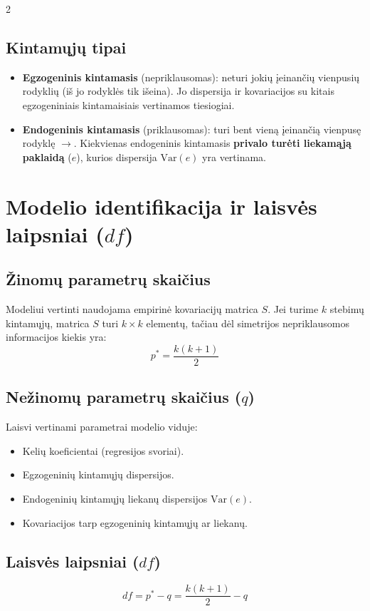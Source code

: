 \documentclass[9pt,a4paper]{article}
\begin{document}
\begin{multicols*}{2}
\subsection{Kintamųjų tipai}
\begin{itemize}
    \item \textbf{Egzogeninis kintamasis} (nepriklausomas): neturi jokių įeinančių vienpusių rodyklių (iš jo rodyklės tik išeina). Jo dispersija ir kovariacijos su kitais egzogeniniais kintamaisiais vertinamos tiesiogiai.
    \item \textbf{Endogeninis kintamasis} (priklausomas): turi bent vieną įeinančią vienpusę rodyklę $\to$. Kiekvienas endogeninis kintamasis \textbf{privalo turėti liekamąją paklaidą} ($e$), kurios dispersija $\text{Var}(e)$ yra vertinama.
\end{itemize}

\section{Modelio identifikacija ir laisvės laipsniai ($df$)}

\subsection{Žinomų parametrų skaičius}
Modeliui vertinti naudojama empirinė kovariacijų matrica $S$. Jei turime $k$ stebimų kintamųjų, matrica $S$ turi $k \times k$ elementų, tačiau dėl simetrijos nepriklausomos informacijos kiekis yra:
\begin{equation*}
    p^* = \frac{k(k + 1)}{2}
\end{equation*}

\subsection{Nežinomų parametrų skaičius ($q$)}
Laisvi vertinami parametrai modelio viduje:
\begin{itemize}
    \item Kelių koeficientai (regresijos svoriai).
    \item Egzogeninių kintamųjų dispersijos.
    \item Endogeninių kintamųjų liekanų dispersijos $\text{Var}(e)$.
    \item Kovariacijos tarp egzogeninių kintamųjų ar liekanų.
\end{itemize}

\subsection{Laisvės laipsniai ($df$)}
\begin{equation*}
    df = p^* - q = \frac{k(k + 1)}{2} - q
\end{equation*}


\end{multicols*}
\end{document}
